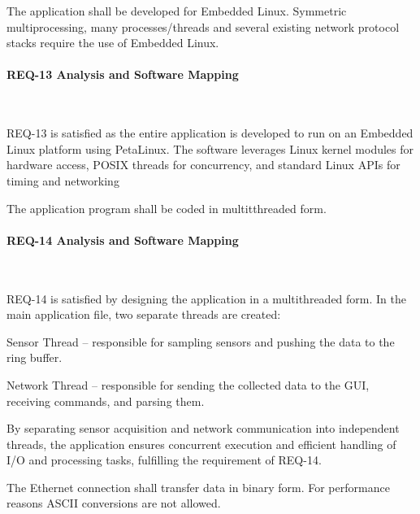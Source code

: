 \begin{tcolorbox}[
    title=REQ-13,
    colback=gray!5,
    colframe=black,
    fonttitle=\bfseries
]
The application shall be developed for Embedded Linux. Symmetric multiprocessing, 
many processes/threads and several existing network protocol stacks require the use 
of Embedded Linux.
\end{tcolorbox}

\paragraph{REQ-13 Analysis and Software Mapping}\

REQ-13 is satisfied as the entire application is developed to run on an Embedded 
Linux platform using PetaLinux. The software leverages Linux kernel modules for 
hardware access, POSIX threads for concurrency, and standard Linux APIs for timing 
and networking


\begin{tcolorbox}[
    title=REQ-14,
    colback=gray!5,
    colframe=black,
    fonttitle=\bfseries
]
The application program shall be coded in multitthreaded form.
\end{tcolorbox}

\paragraph{REQ-14 Analysis and Software Mapping}\

REQ-14 is satisfied by designing the application in a multithreaded form. In the 
main application file, two separate threads are created:

Sensor Thread – responsible for sampling sensors and pushing the data to the ring buffer.

Network Thread – responsible for sending the collected data to the GUI, receiving commands, and parsing them.

By separating sensor acquisition and network communication into independent threads, the application ensures concurrent execution and efficient handling of I/O and processing tasks, fulfilling the requirement of REQ-14.

\begin{tcolorbox}[
    title=REQ-16,
    colback=gray!5,
    colframe=black,
    fonttitle=\bfseries
]
The Ethernet connection shall transfer data in binary form.
For performance reasons ASCII conversions are not allowed.
\end{tcolorbox}

